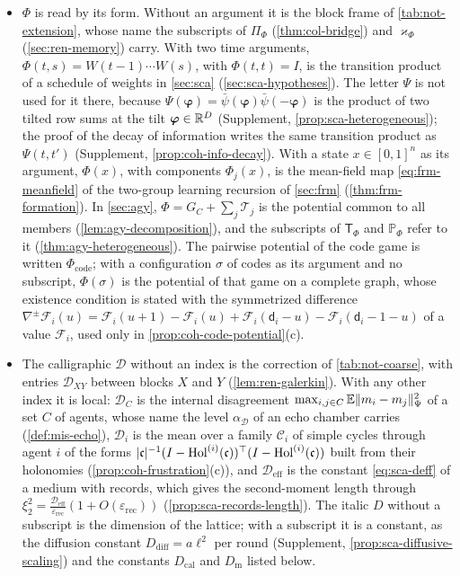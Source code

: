 \begin{itemize}
\item $\Phi$ is read by its form. Without an argument it is the block frame of \cref{tab:not-extension}, whose name the subscripts of $\Pi_\Phi$ (\cref{thm:col-bridge}) and $\varkappa_\Phi$ (\cref{sec:ren-memory}) carry. With two time arguments, $\Phi(t,s)=W(t-1)\cdots W(s)$, with $\Phi(t,t)=I$, is the transition product of a schedule of weights in \cref{sec:sca} (\cref{sec:sca-hypotheses}). The letter $\Psi$ is not used for it there, because $\Psi(\boldsymbol\varphi)=\bar\psi(\boldsymbol\varphi)\bar\psi(-\boldsymbol\varphi)$ is the product of two tilted row sums at the tilt $\boldsymbol\varphi\in\mathbb{R}^D$ (Supplement, \cref{prop:sca-heterogeneous}); the proof of the decay of information writes the same transition product as $\Psi(t,t')$ (Supplement, \cref{prop:coh-info-decay}). With a state $x\in[0,1]^n$ as its argument, $\Phi(x)$, with components $\Phi_j(x)$, is the mean-field map \eqref{eq:frm-meanfield} of the two-group learning recursion of \cref{sec:frm} (\cref{thm:frm-formation}). In \cref{sec:agy}, $\Phi=G_C+\sum_j\mathcal T_j$ is the potential common to all members (\cref{lem:agy-decomposition}), and the subscripts of $\mathsf T_\Phi$ and $\mathbb P_\Phi$ refer to it (\cref{thm:agy-heterogeneous}). The pairwise potential of the code game is written $\Phi_{\mathrm{code}}$; with a configuration $\sigma$ of codes as its argument and no subscript, $\Phi(\sigma)$ is the potential of that game on a complete graph, whose existence condition is stated with the symmetrized difference $\nabla^{\pm}\mathcal F_i(u)=\mathcal F_i(u+1)-\mathcal F_i(u)+\mathcal F_i(\mathsf d_i-u)-\mathcal F_i(\mathsf d_i-1-u)$ of a value $\mathcal F_i$, used only in \cref{prop:coh-code-potential}(c).
\item The calligraphic $\mathcal D$ without an index is the correction of \cref{tab:not-coarse}, with entries $\mathcal D_{XY}$ between blocks $X$ and $Y$ (\cref{lem:ren-galerkin}). With any other index it is local: $\mathcal D_C$ is the internal disagreement $\max_{i,j\in C}\mathbb{E}\lVert m_i-m_j\rVert_\Psi^2$ of a set $C$ of agents, whose name the level $\alpha_{\mathcal D}$ of an echo chamber carries (\cref{def:mis-echo}), $\mathcal D_i$ is the mean over a family $\mathcal C_i$ of simple cycles through agent $i$ of the forms $\lvert\mathfrak c\rvert^{-1}(I-\operatorname{Hol}^{(i)}(\mathfrak c))^\top(I-\operatorname{Hol}^{(i)}(\mathfrak c))$ built from their holonomies (\cref{prop:coh-frustration}(c)), and $\mathcal D_{\mathrm{eff}}$ is the constant \eqref{eq:sca-deff} of a medium with records, which gives the second-moment length through $\xi_2^2=\frac{\mathcal D_{\mathrm{eff}}}{\varepsilon_{\mathrm{rec}}}(1+O(\varepsilon_{\mathrm{rec}}))$ (\cref{prop:sca-records-length}). The italic $D$ without a subscript is the dimension of the lattice; with a subscript it is a constant, as the diffusion constant $D_{\mathrm{diff}}=a\ell^2$ per round (Supplement, \cref{prop:sca-diffusive-scaling}) and the constants $D_{\mathrm{cal}}$ and $D_{\mathrm m}$ listed below.

\end{itemize}

